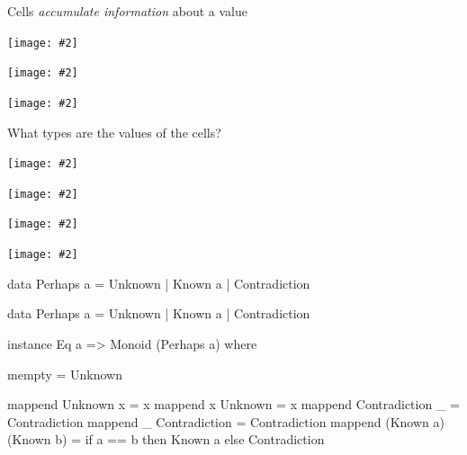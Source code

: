\documentclass[usenames,dvipsnames,svgnames,table,aspectratio=1610,mathserif]{beamer}
\newcommand{\nl}{\vspace{\baselineskip}}
\newcommand{\textslide}[1]{{
\begin{frame}
\begin{center}

#1

\end{center}
\end{frame}
}}
\newcommand{\imageslide}[2][1]{{
\begin{frame}\begin{center}
\texttt{[image: \#2]}
\end{center}\end{frame}
}}
\newcommand{\imageslideleft}[2][1]{{
\begin{frame}
\texttt{[image: \#2]}
\end{frame}
}}
\begin{document}
\textslide{\Large{Cells {\it accumulate information} about a value}}







%


\imageslide[0.6]{doubleplus0.pdf}
\imageslide[0.6]{doubleplus1.pdf}
\imageslide[0.6]{doubleplus2.pdf}


\textslide{{\LARGE
What types are the values of the cells?
}}


\imageslide{cell1.pdf}
\imageslide{cell2.pdf}
\imageslide{cell3.pdf}
\imageslide{cell4.pdf}









\begin{frame}[fragile]
\begin{haskellcode}
data Perhaps a = Unknown | Known a | Contradiction
\end{haskellcode}
\end{frame}

\begin{frame}[fragile]

\begin{haskellcode}
data Perhaps a = Unknown | Known a | Contradiction
\end{haskellcode}

\nl

\begin{haskellcode}
instance Eq a => Monoid (Perhaps a) where

  mempty = Unknown

  mappend Unknown x           = x
  mappend x       Unknown     = x
  mappend Contradiction _     = Contradiction
  mappend _     Contradiction = Contradiction
  mappend (Known a) (Known b) =
    if a == b
      then Known a
      else Contradiction
\end{haskellcode}

\end{frame}
\end{document}
